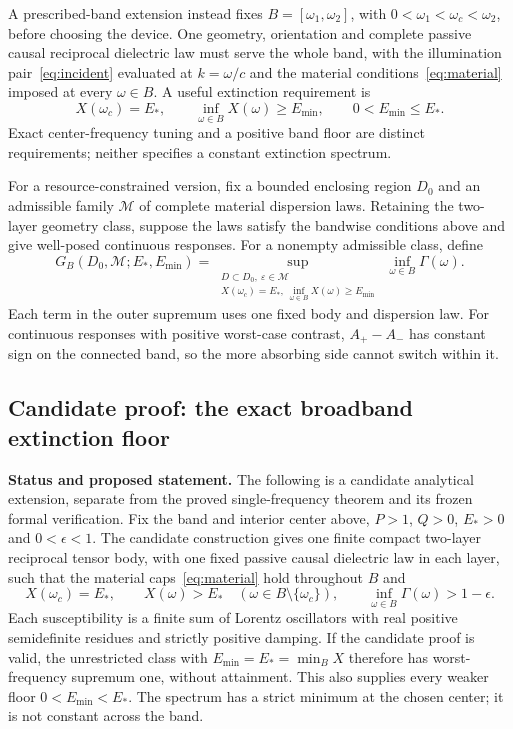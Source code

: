 \documentclass[11pt]{article}
\begin{document}
A prescribed-band extension instead fixes $B=[\omega_1,\omega_2]$, with $0<\omega_1<\omega_c<\omega_2$, before choosing the device. One geometry, orientation and complete passive causal reciprocal dielectric law must serve the whole band, with the illumination pair~\eqref{eq:incident} evaluated at $k=\omega/c$ and the material conditions~\eqref{eq:material} imposed at every $\omega\in B$. A useful extinction requirement is
\[
 X(\omega_c)=E_*,\qquad
 \inf_{\omega\in B}X(\omega)\geq E_{\min},\qquad
 0<E_{\min}\leq E_*.
\]
Exact center-frequency tuning and a positive band floor are distinct requirements; neither specifies a constant extinction spectrum.

For a resource-constrained version, fix a bounded enclosing region $D_0$ and an admissible family $\mathcal M$ of complete material dispersion laws. Retaining the two-layer geometry class, suppose the laws satisfy the bandwise conditions above and give well-posed continuous responses. For a nonempty admissible class, define
\[
 G_B(D_0,\mathcal M;E_*,E_{\min})=
 \sup_{\substack{D\subset D_0,\ \varepsilon\in\mathcal M\\
 X(\omega_c)=E_*,\ \inf_{\omega\in B}X(\omega)\geq E_{\min}}}
 \ \inf_{\omega\in B}\Gamma(\omega).
\]
Each term in the outer supremum uses one fixed body and dispersion law. For continuous responses with positive worst-case contrast, $A_+-A_-$ has constant sign on the connected band, so the more absorbing side cannot switch within it.

\subsection{Candidate proof: the exact broadband extinction floor}\label{sec:boundary-candidate}
\noindent\textbf{Status and proposed statement.}
The following is a candidate analytical extension, separate from the proved single-frequency theorem and its frozen formal verification. Fix the band and interior center above, $P>1$, $Q>0$, $E_*>0$ and $0<\epsilon<1$. The candidate construction gives one finite compact two-layer reciprocal tensor body, with one fixed passive causal dielectric law in each layer, such that the material caps~\eqref{eq:material} hold throughout $B$ and
\[
 X(\omega_c)=E_*,\qquad
 X(\omega)>E_*\quad(\omega\in B\setminus\{\omega_c\}),\qquad
 \inf_{\omega\in B}\Gamma(\omega)>1-\epsilon.
\]
Each susceptibility is a finite sum of Lorentz oscillators with real positive semidefinite residues and strictly positive damping. If the candidate proof is valid, the unrestricted class with $E_{\min}=E_*=\min_BX$ therefore has worst-frequency supremum one, without attainment. This also supplies every weaker floor $0<E_{\min}<E_*$. The spectrum has a strict minimum at the chosen center; it is not constant across the band.
\end{document}
